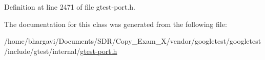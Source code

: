 Definition at line 2471 of file gtest-\/port.\+h.



The documentation for this class was generated from the following file\+:\begin{DoxyCompactItemize}
\item 
/home/bhargavi/\+Documents/\+S\+D\+R/\+Copy\+\_\+\+Exam\+\_\+X/vendor/googletest/googletest/include/gtest/internal/\hyperlink{gtest-port_8h}{gtest-\/port.\+h}\end{DoxyCompactItemize}

